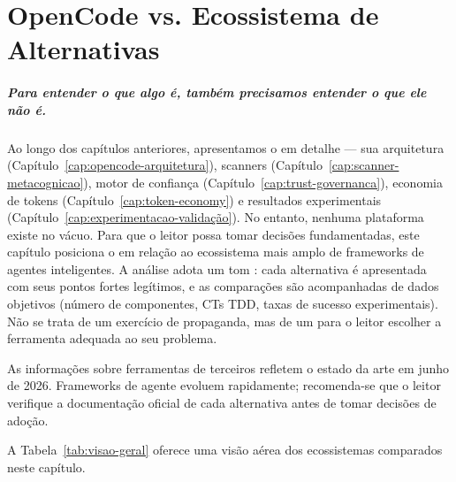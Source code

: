 \chapter{OpenCode vs. Ecossistema de Alternativas}
\label{ch:comparacao}
\paragraph{Para entender o que algo é, também precisamos entender o que ele
não é.} Ao longo dos capítulos anteriores, apresentamos o \opencodeeco{} em
detalhe --- sua arquitetura (Capítulo~\ref{cap:opencode-arquitetura}),
scanners (Capítulo~\ref{cap:scanner-metacognicao}), motor de confiança
(Capítulo~\ref{cap:trust-governanca}), economia de tokens
(Capítulo~\ref{cap:token-economy}) e resultados experimentais
(Capítulo~\ref{cap:experimentacao-validação}). No entanto, nenhuma
plataforma existe no vácuo. Para que o leitor possa tomar decisões
fundamentadas, este capítulo posiciona o \opencodeeco{} em relação ao
ecossistema mais amplo de frameworks de agentes inteligentes.
A análise adota um tom : cada alternativa é
apresentada com seus pontos fortes legítimos, e as comparações são
acompanhadas de dados objetivos (número de componentes, CTs TDD, taxas de
sucesso experimentais). Não se trata de um exercício de propaganda, mas de
um  para o leitor escolher a ferramenta adequada
ao seu problema.
\begin{observacao}
As informações sobre ferramentas de terceiros refletem o estado da arte em
junho de 2026. Frameworks de agente evoluem rapidamente; recomenda-se que o
leitor verifique a documentação oficial de cada alternativa antes de tomar
decisões de adoção.
\end{observacao}
A Tabela~\ref{tab:visao-geral} oferece uma visão aérea dos ecossistemas
comparados neste capítulo.
